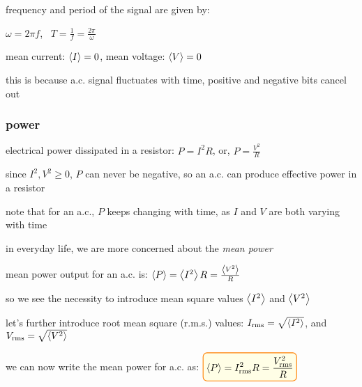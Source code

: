 frequency and period of the signal are given by:

{

\centering

$\omega = 2 \pi f$, $\,$ $T = \frac{1}{f} = \frac{2\pi}{\omega} $

}

\cmt mean current: $\left< I \right> = 0$, mean voltage: $\left< V \right>=0$

this is because a.c. signal fluctuates with time, positive and negative bits cancel out

\newpage







\subsubsection{power}

electrical power dissipated in a resistor: $P = I^2 R$, or, $P=\frac{V^2}{R}$

since $I^2, V^2 \geq 0$, $P$ can never be negative, so an a.c. can produce effective power in a resistor

note that for an a.c., $P$ keeps changing with time, as $I$ and $V$ are both varying with time

in everyday life, we are more concerned about the \emph{mean power}

mean power output for an a.c. is: $\left< P \right> = \left< I^2 \right> R = \frac{\left< V^2 \right>}{R}$

so we see the necessity to introduce mean square values $\left< I^2 \right>$  and $\left< V^2 \right>$

let's further introduce root mean square (r.m.s.) values: $I_\text{rms} = \sqrt{\left< I^2 \right>}$, and $V_\text{rms} = \sqrt{\left< V^2 \right>}$

we can now write the mean power for a.c. as: $\boxed{\avg{P} = I^2_\text{rms} R = \frac{V^2_\text{rms}}{R}}$

